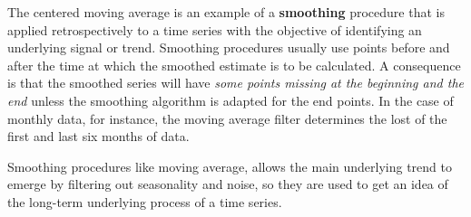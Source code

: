 \documentclass[
]{article}
\newenvironment{Shaded}{\begin{snugshade}}{\end{snugshade}}
\newcommand{\CommentTok}[1]{\textcolor[rgb]{0.56,0.35,0.01}{\textit{#1}}}
\newcommand{\DataTypeTok}[1]{\textcolor[rgb]{0.13,0.29,0.53}{#1}}
\newcommand{\DecValTok}[1]{\textcolor[rgb]{0.00,0.00,0.81}{#1}}
\newcommand{\KeywordTok}[1]{\textcolor[rgb]{0.13,0.29,0.53}{\textbf{#1}}}
\newcommand{\NormalTok}[1]{#1}
\newcommand{\OperatorTok}[1]{\textcolor[rgb]{0.81,0.36,0.00}{\textbf{#1}}}
\newcommand{\StringTok}[1]{\textcolor[rgb]{0.31,0.60,0.02}{#1}}
\begin{document}
The centered moving average is an example of a \textbf{smoothing} procedure that is applied retrospectively to a time series with the objective of identifying an underlying signal or trend. Smoothing procedures usually use points before and after the time at which the smoothed estimate is to be calculated. A consequence is that the smoothed series will have \emph{some points missing at the beginning and the end} unless the smoothing algorithm is adapted for the end points. In the case of monthly data, for instance, the moving average filter determines the lost of the first and last six months of data.

Smoothing procedures like moving average, allows the main underlying trend to emerge by filtering out seasonality and noise, so they are used to get an idea of the long-term underlying process of a time series.

\begin{Shaded}
\end{Shaded}
\end{document}
